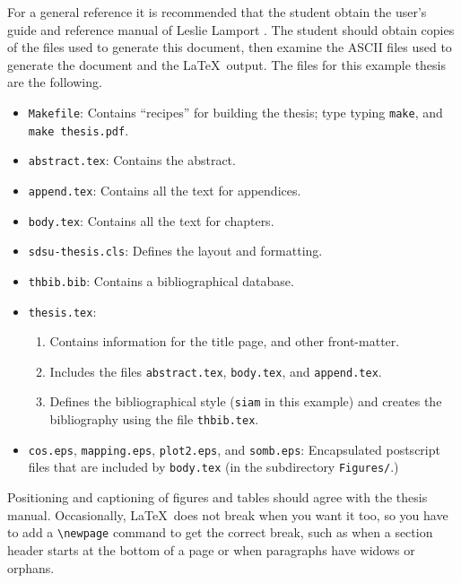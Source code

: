 For a general reference it is recommended that the student obtain the
user's guide and reference manual of Leslie Lamport \cite{LAM}. The
student should obtain copies of the files used to generate this
document, then examine the ASCII files used to generate the document
and the \LaTeX\ output.  The files for this example thesis are the
following.
\begin{itemize}
\item \verb+Makefile+: Contains ``recipes'' for building the thesis;
  type typing \verb+make+, and \verb+make thesis.pdf+.
\item \verb+abstract.tex+: Contains the abstract.
\item \verb+append.tex+: Contains all the text for appendices.
\item \verb+body.tex+: Contains all the text for chapters. 
\item \verb+sdsu-thesis.cls+: Defines the layout and formatting.
\item \verb+thbib.bib+:  Contains a bibliographical database.
\item \verb+thesis.tex+: 
  \begin{enumerate}
  \item  Contains information for the title page, and other
    front-matter.
  \item Includes the files \verb+abstract.tex+,  \verb+body.tex+, and
    \verb+append.tex+. 
  \item Defines the bibliographical style (\verb+siam+ in this
    example) and creates the bibliography using the file
    \verb+thbib.tex+.
  \end{enumerate}
\item \verb+cos.eps+, \verb+mapping.eps+, \verb+plot2.eps+, and
  \verb+somb.eps+: Encapsulated postscript files that are included by
  \verb+body.tex+ (in the subdirectory \verb+Figures/+.)
\end{itemize}

Positioning and captioning of figures and tables should agree with the
thesis manual.  Occasionally, \LaTeX\ does not break when you want it
too, so you have to add a \verb+\newpage+ command to get
the correct break, such as when a section header starts at the bottom
of a page or when paragraphs have widows or orphans.


